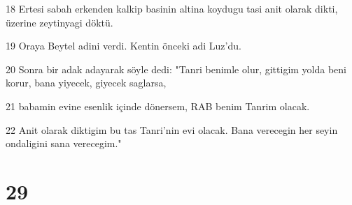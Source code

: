 \par 18 Ertesi sabah erkenden kalkip basinin altina koydugu tasi anit olarak dikti, üzerine zeytinyagi döktü.
\par 19 Oraya Beytel adini verdi. Kentin önceki adi Luz'du.
\par 20 Sonra bir adak adayarak söyle dedi: "Tanri benimle olur, gittigim yolda beni korur, bana yiyecek, giyecek saglarsa,
\par 21 babamin evine esenlik içinde dönersem, RAB benim Tanrim olacak.
\par 22 Anit olarak diktigim bu tas Tanri'nin evi olacak. Bana verecegin her seyin ondaligini sana verecegim."

\chapter{29}


